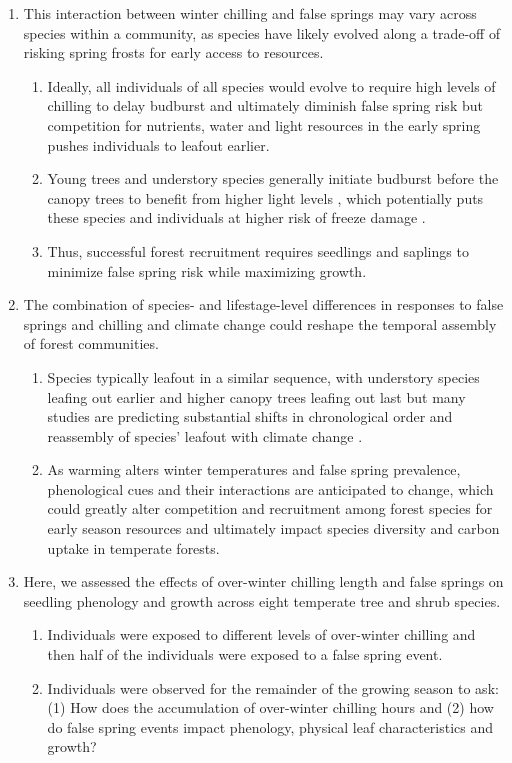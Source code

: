 \documentclass{article}\usepackage[]{graphicx}\usepackage[]{color}
\begin{document}
\begin{enumerate}
  
\item This interaction between winter chilling and false springs may vary across species within a community, as species have likely evolved along a trade-off of risking spring frosts for early access to resources.
  \begin{enumerate}
  \item Ideally, all individuals of all species would evolve to require high levels of chilling to delay budburst and ultimately diminish false spring risk but competition for nutrients, water and light resources in the early spring pushes individuals to leafout earlier.  %
  \item Young trees and understory species generally initiate budburst before the canopy trees to benefit from higher light levels \citep {Augspurger2008, Vitasse2013}, which potentially puts these species and individuals at higher risk of freeze damage \citep{Vitasse2014}.
  \item Thus, successful forest recruitment requires seedlings and saplings to minimize false spring risk while maximizing growth.
   \end{enumerate}
 

\item The combination of species- and lifestage-level differences in responses to false springs and chilling and climate change could reshape the temporal assembly of forest communities. 
  \begin{enumerate}
  \item Species typically leafout in a similar sequence, with understory species leafing out earlier and higher canopy trees leafing out last but many studies are predicting substantial shifts in chronological order and reassembly of species' leafout with climate change \citep{Roberts2015, Laube2014}.
  \item As warming alters winter temperatures and false spring prevalence, phenological cues and their interactions are anticipated to change, which could greatly alter competition and recruitment among forest species for early season resources and ultimately impact species diversity and carbon uptake in temperate forests.
  \end{enumerate}
  
\item Here, we assessed the effects of over-winter chilling length and false springs on seedling phenology and growth across eight temperate tree and shrub species. 
  \begin{enumerate}
  \item Individuals were exposed to different levels of over-winter chilling and then half of the individuals were exposed to a false spring event. 
  \item Individuals were observed for the remainder of the growing season to ask: (1) How does the accumulation of over-winter chilling hours and (2) how do false spring events impact phenology, physical leaf characteristics and growth?
  \end{enumerate}
\end{enumerate}
  
\end{document}
